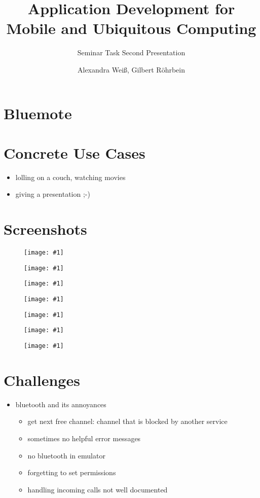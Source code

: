 \documentclass[ddc nogerman]{tudbeamer}
\newcommand{\imageframe}[1]{
    \begin{frame}
        \begin{figure}
            \centering
            \texttt{[image: \#1]}
        \end{figure}
    \end{frame}
}
\begin{document}

\title{Application Development for Mobile and Ubiquitous Computing}
\subtitle{Seminar Task Second Presentation}
\author{Alexandra Weiß, Gilbert Röhrbein}

\maketitle

\section{Bluemote}
\begin{frame}
\end{frame}

\section{Concrete Use Cases}
\begin{frame}
    \begin{itemize}
        \item lolling on a couch, watching movies
        \item giving a presentation ;-)
    \end{itemize}
\end{frame}

\section{Screenshots}
\imageframe{img/btactivate.png}
\imageframe{img/btauth.png}
\imageframe{img/choosedevice.png}
\imageframe{img/choosefunction.png}
\imageframe{img/presentation.png}
\imageframe{img/vlc.png}

\imageframe{img/components.pdf}

\section{Challenges}
\begin{frame}
    \begin{itemize}
        \item bluetooth and its annoyances
        \begin{itemize}
        	\item get next free channel: channel that is blocked by another service
        	\item sometimes no helpful error messages
            \item no bluetooth in emulator
            \item forgetting to set permissions
            \item handling incoming calls not well documented
        \end{itemize}
    \end{itemize}
\end{frame}
\end{document}
